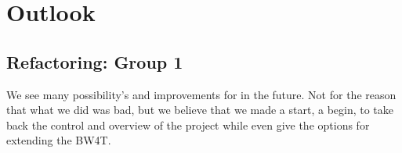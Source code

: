 \documentclass{article}
\begin{document}
\section{Outlook}

\subsection*{Refactoring: Group 1}
We see many possibility's and improvements for in the future. Not for the reason that what we did was bad, but we believe that we made a start, a begin, to take back the control and overview of the project while even give the options for extending the BW4T. 
\end{document}
